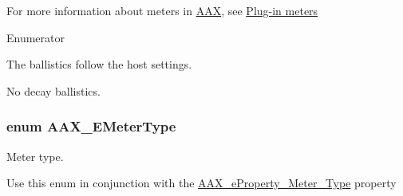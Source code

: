 For more information about meters in \hyperlink{a00288}{A\+A\+X}, see \hyperlink{a00337}{Plug-\/in meters} \begin{Desc}
\item[Enumerator]\par
\begin{description}
\item[{\em 
\hypertarget{a00206_a9aaedbe356691c4e4584fa7ccdbcc776af3d4aa787364b763f5396545a8b9e2d4}{}A\+A\+X\+\_\+e\+Meter\+Ballistic\+Type\+\_\+\+Host\label{a00206_a9aaedbe356691c4e4584fa7ccdbcc776af3d4aa787364b763f5396545a8b9e2d4}
}]The ballistics follow the host settings. \item[{\em 
\hypertarget{a00206_a9aaedbe356691c4e4584fa7ccdbcc776afd1c5e8f175325ec4f7b377f8db14657}{}A\+A\+X\+\_\+e\+Meter\+Ballistic\+Type\+\_\+\+No\+Decay\label{a00206_a9aaedbe356691c4e4584fa7ccdbcc776afd1c5e8f175325ec4f7b377f8db14657}
}]No decay ballistics. \end{description}
\end{Desc}
\hypertarget{a00206_a590815545eaf0d3be0bb8f656fe2a761}{}
\subsubsection[{A\+A\+X\+\_\+\+E\+Meter\+Type}]{\setlength{\rightskip}{0pt plus 5cm}enum {\bf A\+A\+X\+\_\+\+E\+Meter\+Type}}\label{a00206_a590815545eaf0d3be0bb8f656fe2a761}


Meter type. 

Use this enum in conjunction with the \hyperlink{a00283_a6571f4e41a5dd06e4067249228e2249ea70c5dbea78be92b053eec1719cb39569}{A\+A\+X\+\_\+e\+Property\+\_\+\+Meter\+\_\+\+Type} property

